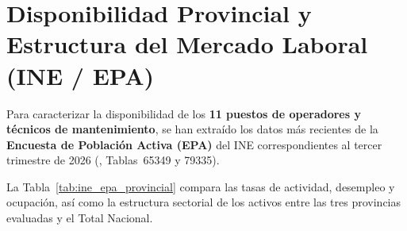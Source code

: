 \documentclass{report}
\begin{document}
\section{Disponibilidad Provincial y Estructura del Mercado Laboral (INE / EPA)}
Para caracterizar la disponibilidad de los \textbf{\num{11} puestos de operadores y técnicos de mantenimiento}, se han extraído los datos más recientes de la \textbf{Encuesta de Población Activa (EPA)} del INE correspondientes al tercer trimestre de \num{2026} (\autocite{INE_EPA2026}, Tablas~65349 y 79335).

La Tabla~\ref{tab:ine_epa_provincial} compara las tasas de actividad, desempleo y ocupación, así como la estructura sectorial de los activos entre las tres provincias evaluadas y el Total Nacional.

\begin{table}[H]
    \centering
    \caption{Indicadores del mercado laboral y distribución sectorial de activos (INE / EPA 2026T3).}
    \label{tab:ine_epa_provincial}
\end{table}
\end{document}
